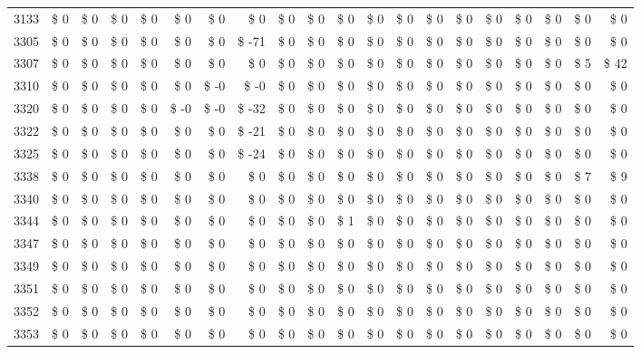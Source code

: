 \begin{longtable}{lrrrrrrrrrrrrrrrrrrr}
3133 & \$ 0 & \$ 0 & \$ 0 & \$ 0 & \$ 0 & \$ 0 & \$ 0 & \$ 0 & \$ 0 & \$ 0 & \$ 0 & \$ 0 & \$ 0 & \$ 0 & \$ 0 & \$ 0 & \$ 0 & \$ 0 & \$ 0 \\
3305 & \$ 0 & \$ 0 & \$ 0 & \$ 0 & \$ 0 & \$ 0 & \$ -71 & \$ 0 & \$ 0 & \$ 0 & \$ 0 & \$ 0 & \$ 0 & \$ 0 & \$ 0 & \$ 0 & \$ 0 & \$ 0 & \$ 0 \\
3307 & \$ 0 & \$ 0 & \$ 0 & \$ 0 & \$ 0 & \$ 0 & \$ 0 & \$ 0 & \$ 0 & \$ 0 & \$ 0 & \$ 0 & \$ 0 & \$ 0 & \$ 0 & \$ 0 & \$ 0 & \$ 5 & \$ 42 \\
3310 & \$ 0 & \$ 0 & \$ 0 & \$ 0 & \$ 0 & \$ -0 & \$ -0 & \$ 0 & \$ 0 & \$ 0 & \$ 0 & \$ 0 & \$ 0 & \$ 0 & \$ 0 & \$ 0 & \$ 0 & \$ 0 & \$ 0 \\
3320 & \$ 0 & \$ 0 & \$ 0 & \$ 0 & \$ -0 & \$ -0 & \$ -32 & \$ 0 & \$ 0 & \$ 0 & \$ 0 & \$ 0 & \$ 0 & \$ 0 & \$ 0 & \$ 0 & \$ 0 & \$ 0 & \$ 0 \\
3322 & \$ 0 & \$ 0 & \$ 0 & \$ 0 & \$ 0 & \$ 0 & \$ -21 & \$ 0 & \$ 0 & \$ 0 & \$ 0 & \$ 0 & \$ 0 & \$ 0 & \$ 0 & \$ 0 & \$ 0 & \$ 0 & \$ 0 \\
3325 & \$ 0 & \$ 0 & \$ 0 & \$ 0 & \$ 0 & \$ 0 & \$ -24 & \$ 0 & \$ 0 & \$ 0 & \$ 0 & \$ 0 & \$ 0 & \$ 0 & \$ 0 & \$ 0 & \$ 0 & \$ 0 & \$ 0 \\
3338 & \$ 0 & \$ 0 & \$ 0 & \$ 0 & \$ 0 & \$ 0 & \$ 0 & \$ 0 & \$ 0 & \$ 0 & \$ 0 & \$ 0 & \$ 0 & \$ 0 & \$ 0 & \$ 0 & \$ 0 & \$ 7 & \$ 9 \\
3340 & \$ 0 & \$ 0 & \$ 0 & \$ 0 & \$ 0 & \$ 0 & \$ 0 & \$ 0 & \$ 0 & \$ 0 & \$ 0 & \$ 0 & \$ 0 & \$ 0 & \$ 0 & \$ 0 & \$ 0 & \$ 0 & \$ 0 \\
3344 & \$ 0 & \$ 0 & \$ 0 & \$ 0 & \$ 0 & \$ 0 & \$ 0 & \$ 0 & \$ 0 & \$ 1 & \$ 0 & \$ 0 & \$ 0 & \$ 0 & \$ 0 & \$ 0 & \$ 0 & \$ 0 & \$ 0 \\
3347 & \$ 0 & \$ 0 & \$ 0 & \$ 0 & \$ 0 & \$ 0 & \$ 0 & \$ 0 & \$ 0 & \$ 0 & \$ 0 & \$ 0 & \$ 0 & \$ 0 & \$ 0 & \$ 0 & \$ 0 & \$ 0 & \$ 0 \\
3349 & \$ 0 & \$ 0 & \$ 0 & \$ 0 & \$ 0 & \$ 0 & \$ 0 & \$ 0 & \$ 0 & \$ 0 & \$ 0 & \$ 0 & \$ 0 & \$ 0 & \$ 0 & \$ 0 & \$ 0 & \$ 0 & \$ 0 \\
3351 & \$ 0 & \$ 0 & \$ 0 & \$ 0 & \$ 0 & \$ 0 & \$ 0 & \$ 0 & \$ 0 & \$ 0 & \$ 0 & \$ 0 & \$ 0 & \$ 0 & \$ 0 & \$ 0 & \$ 0 & \$ 0 & \$ 0 \\
3352 & \$ 0 & \$ 0 & \$ 0 & \$ 0 & \$ 0 & \$ 0 & \$ 0 & \$ 0 & \$ 0 & \$ 0 & \$ 0 & \$ 0 & \$ 0 & \$ 0 & \$ 0 & \$ 0 & \$ 0 & \$ 0 & \$ 0 \\
3353 & \$ 0 & \$ 0 & \$ 0 & \$ 0 & \$ 0 & \$ 0 & \$ 0 & \$ 0 & \$ 0 & \$ 0 & \$ 0 & \$ 0 & \$ 0 & \$ 0 & \$ 0 & \$ 0 & \$ 0 & \$ 0 & \$ 0 \\

\end{longtable}
